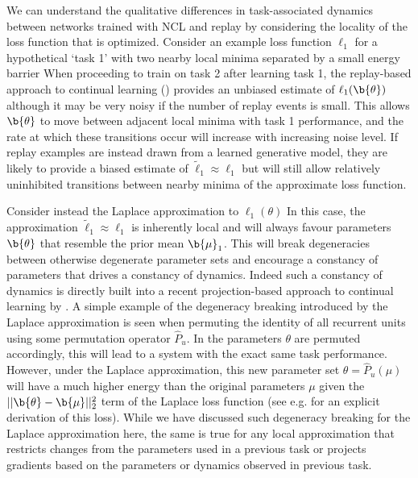 We can understand the qualitative differences in task-associated dynamics between networks trained with NCL and replay by considering the locality of the loss function that is optimized.
Consider an example loss function $\ell_1$ for a hypothetical `task 1' with two nearby local minima separated by a small energy barrier %
When proceeding to train on task 2 after learning task 1, the replay-based approach to continual learning () provides an unbiased estimate of $\ell_1(\b{\theta})$ although it may be very noisy if the number of replay events is small.
This allows $\b{\theta}$ to move between adjacent local minima with task 1 performance, and the rate at which these transitions occur will increase with increasing noise level.
If replay examples are instead drawn from a learned generative model, they are likely to provide a biased estimate of $\tilde{\ell}_1 \approx \ell_1$ but will still allow relatively uninhibited transitions between nearby minima of the approximate loss function.

%

Consider instead the Laplace approximation to $\ell_1(\theta)$ %
In this case, the approximation $\tilde{\ell}_1 \approx \ell_1$ is inherently local and will always favour parameters $\b{\theta}$ that resemble the prior mean $\b{\mu}_1$.
This will break degeneracies between otherwise degenerate parameter sets and encourage a constancy of parameters that drives a constancy of dynamics.
Indeed such a constancy of dynamics is directly built into a recent projection-based approach to continual learning by \citet{duncker2020organizing}.
A simple example of the degeneracy breaking introduced by the Laplace approximation is seen when permuting the identity of all recurrent units using some permutation operator $\hat{P}_u$.
In the parameters $\theta$ are permuted accordingly, this will lead to a system with the exact same task performance.
However, under the Laplace approximation, this new parameter set $\theta = \hat{P}_u(\mu)$ will have a much higher energy than the original parameters $\mu$ given the $||\b{\theta} - \b{\mu}||^2_2$ term of the Laplace loss function (see e.g. \citealp{huszar2017quadratic} for an explicit derivation of this loss).
While we have discussed such degeneracy breaking for the Laplace approximation here, the same is true for any local approximation that restricts changes from the parameters used in a previous task or projects gradients based on the parameters or dynamics observed in previous task.

